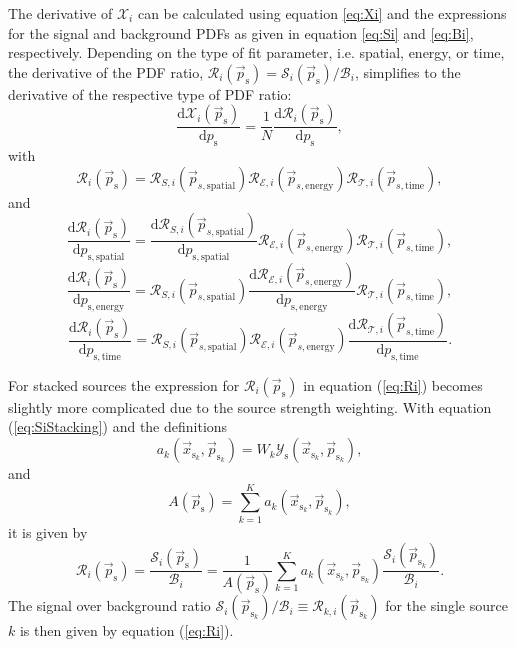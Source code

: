 \documentclass{article}
\newcommand{\ps}{\vec{p}_{\mathrm{s}}}
\newcommand{\psk}{\vec{p}_{\mathrm{s}_k}}
\newcommand{\xsk}{\vec{x}_{\mathrm{s}_k}}
\begin{document}
The derivative of $\mathcal{X}_i$ can be calculated using
equation \ref{eq:Xi} and the expressions for the signal and background PDFs as given
in equation \ref{eq:Si} and \ref{eq:Bi}, respectively. Depending on the type of
fit parameter, i.e. spatial, energy, or time, the derivative of the PDF ratio,
$\mathcal{R}_i(\ps) = \mathcal{S}_i(\ps) / \mathcal{B}_i$, simplifies to the
derivative of the respective type of PDF ratio:
\begin{equation}
 \frac{\mathrm{d} \mathcal{X}_i(\ps)}{\mathrm{d} p_{\mathrm{s}}} = \frac{1}{N}\frac{\mathrm{d} \mathcal{R}_i(\ps)}{\mathrm{d} p_{\mathrm{s}}},
\end{equation}
with
\begin{equation}
 \mathcal{R}_i(\ps) = \mathcal{R}_{S,i}(\vec{p}_{s,\mathrm{spatial}}) \mathcal{R}_{\mathcal{E},i}(\vec{p}_{s,\mathrm{energy}}) \mathcal{R}_{\mathcal{T},i}(\vec{p}_{s,\mathrm{time}}),
 \label{eq:Ri}
\end{equation}
and
\begin{equation}
 \frac{\mathrm{d} \mathcal{R}_i(\ps)}{\mathrm{d} p_{\mathrm{s,spatial}}} = \frac{\mathrm{d} \mathcal{R}_{S,i}(\vec{p}_{s,\mathrm{spatial}})}{\mathrm{d} p_{\mathrm{s,spatial}}} \mathcal{R}_{\mathcal{E},i}(\vec{p}_{s,\mathrm{energy}}) \mathcal{R}_{\mathcal{T},i}(\vec{p}_{s,\mathrm{time}}),
\end{equation}
\begin{equation}
 \frac{\mathrm{d} \mathcal{R}_i(\ps)}{\mathrm{d} p_{\mathrm{s,energy}}} = \mathcal{R}_{S,i}(\vec{p}_{s,\mathrm{spatial}}) \frac{\mathrm{d} \mathcal{R}_{\mathcal{E},i}(\vec{p}_{s,\mathrm{energy}})}{\mathrm{d} p_{\mathrm{s,energy}}} \mathcal{R}_{\mathcal{T},i}(\vec{p}_{s,\mathrm{time}}),
\end{equation}
\begin{equation}
 \frac{\mathrm{d} \mathcal{R}_i(\ps)}{\mathrm{d} p_{\mathrm{s,time}}} = \mathcal{R}_{S,i}(\vec{p}_{s,\mathrm{spatial}}) \mathcal{R}_{\mathcal{E},i}(\vec{p}_{s,\mathrm{energy}}) \frac{\mathrm{d} \mathcal{R}_{\mathcal{T},i}(\vec{p}_{s,\mathrm{time}})}{\mathrm{d} p_{\mathrm{s,time}}}.
\end{equation}

For stacked sources the expression for $\mathcal{R}_i(\ps)$ in equation (\ref{eq:Ri})
becomes slightly more complicated due to the source strength weighting.
With equation (\ref{eq:SiStacking}) and the definitions
\begin{equation}
 a_k(\xsk,\psk) = W_k\mathcal{Y}_{\mathrm{s}}(\xsk,\psk),
\end{equation}
and
\begin{equation}
 A(\ps) = \sum_{k=1}^{K} a_k(\xsk,\psk),
\end{equation}
it is given by
\begin{equation}
\mathcal{R}_i(\ps) = \frac{\mathcal{S}_i(\ps)}{\mathcal{B}_i} = \frac{1}{A(\ps)} \sum_{k=1}^{K} a_k(\xsk,\psk) \frac{\mathcal{S}_{i}(\psk)}{\mathcal{B}_{i}}.
\label{eq:RiStacking}
\end{equation}
The signal over background ratio $\mathcal{S}_{i}(\psk) / \mathcal{B}_{i} \equiv \mathcal{R}_{k,i}(\psk)$
for the single source $k$ is then given by equation (\ref{eq:Ri}).
\end{document}
